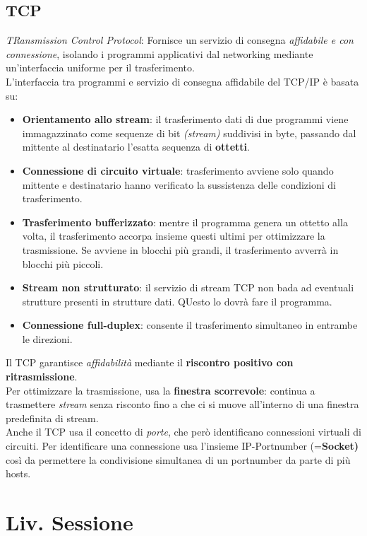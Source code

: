 \documentclass[a4paper,11pt]{article}
\begin{document}
\subsection{TCP}
\textit{TRansmission Control Protocol}: Fornisce un servizio di consegna \textit{affidabile e con connessione}, isolando i programmi applicativi dal networking mediante un'interfaccia uniforme per il trasferimento.\\
L'interfaccia tra programmi e servizio di consegna affidabile del TCP/IP è basata su:
\begin{itemize}
\item \textbf{Orientamento allo stream}: il trasferimento dati di due programmi viene immagazzinato come sequenze di bit \textit{(stream)} suddivisi in byte, passando dal mittente al destinatario l'esatta sequenza di \textbf{ottetti}.
\item \textbf{Connessione di circuito virtuale}: trasferimento avviene solo quando mittente e destinatario hanno verificato la sussistenza delle condizioni di trasferimento.
\item\textbf{Trasferimento bufferizzato}: mentre il programma genera un ottetto alla volta, il trasferimento accorpa insieme questi ultimi per ottimizzare la trasmissione. Se avviene in blocchi più grandi, il trasferimento avverrà in blocchi più piccoli.
\item\textbf{Stream non strutturato}: il servizio di stream TCP non bada ad eventuali strutture presenti in strutture dati. QUesto lo dovrà fare il programma.
\item\textbf{Connessione full-duplex}: consente il trasferimento simultaneo in entrambe le direzioni.
\end{itemize}
Il TCP garantisce \textit{affidabilità} mediante il \textbf{riscontro positivo con ritrasmissione}.\\
Per ottimizzare la trasmissione, usa la \textbf{finestra scorrevole}: continua a trasmettere \textit{stream} senza risconto fino a che ci si muove all'interno di una finestra predefinita di stream.\\
Anche il TCP usa il concetto di \textit{porte},  che però identificano connessioni virtuali di circuiti. Per identificare una connessione usa l'insieme IP-Portnumber (=\textbf{Socket)} così da permettere la condivisione simultanea di un portnumber da parte di più hosts.
\newpage

\section{Liv. Sessione}
\end{document}
